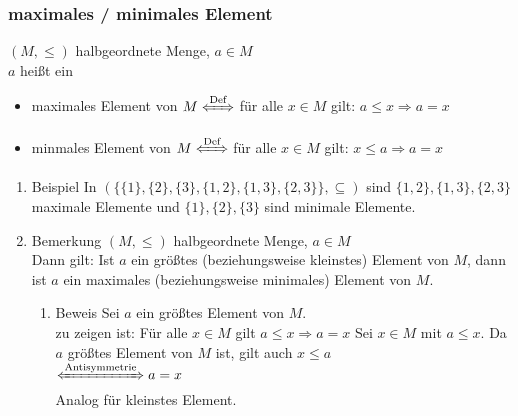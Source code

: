 \documentclass[11pt]{article}
\begin{document}
\subsubsection{maximales / minimales Element}
\label{sec-2-5-5}
$(M,\leq)$ halbgeordnete Menge, $a\in M$ \\
    $a$ heißt ein
\begin{itemize}
\item maximales Element von $M \xLeftrightarrow{\text{Def}}$ für alle $x\in M$ gilt: $a\leq x \Rightarrow a = x$
\item minmales Element von $M \xLeftrightarrow{\text{Def}}$ für alle $x\in M$ gilt: $x\leq a \Rightarrow a = x$
\end{itemize}
\begin{enumerate}
\item Beispiel
\label{sec-2-5-5-1}
In $(\{\{1\},\{2\},\{3\},\{1,2\},\{1,3\},\{2,3\}\}, \subseteq)$ sind $\{1,2\},\{1,3\},\{2,3\}$ maximale Elemente und $\{1\},\{2\},\{3\}$ sind minimale Elemente.
\item Bemerkung
\label{sec-2-5-5-2}
$(M,\leq)$ halbgeordnete Menge, $a\in M$ \\
     Dann gilt: Ist $a$ ein größtes (beziehungsweise kleinstes) Element von $M$, dann ist $a$ ein maximales (beziehungsweise minimales) Element von $M$.
\begin{enumerate}
\item Beweis
\label{sec-2-5-5-2-1}
Sei $a$ ein größtes Element von $M$. \\
      zu zeigen ist: Für alle $x\in M$ gilt $a\leq x \Rightarrow a = x$
Sei $x\in M$ mit $a\leq x$. Da $a$ größtes Element von $M$ ist, gilt auch $x\leq a$ \\
      $\xLeftrightarrow{\text{Antisymmetrie}} a = x$ \\
      Analog für kleinstes Element.
\end{enumerate}
\end{enumerate}
\end{document}
